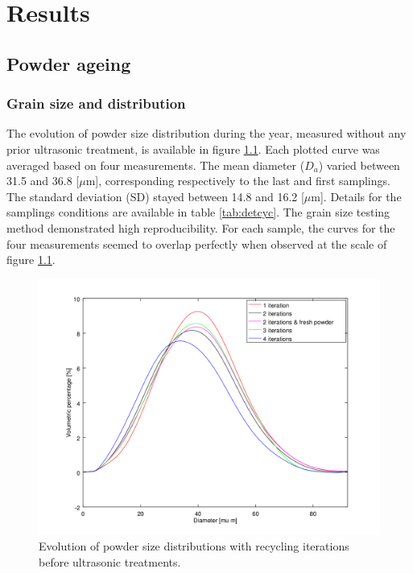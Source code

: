 \chapter{Results}
\label{Chap4}
\section{Powder ageing}

\subsection{Grain size and distribution}
\label{RGSAD}

The evolution of powder size distribution during the year, measured without any prior ultrasonic treatment, is available in figure \ref{fig:granulo}. Each plotted curve was averaged based on four measurements. The mean diameter ($D_a$) varied between 31.5 and 36.8 [$\mu$m], corresponding respectively to the last and first samplings. The standard deviation (SD) stayed between 14.8 and 16.2 [$\mu$m]. Details for the samplings conditions are available  in table \ref{tab:detcyc}. The grain size testing method demonstrated high reproducibility. For each sample, the curves for the four measurements seemed to overlap perfectly when observed at the scale of figure \ref{fig:granulo}.\\%

\begin{figure}[ht]
	\centering
	\includegraphics[scale=0.73]{Images/Granulo}
	\decoRule
	\caption[Evolution of powder size distributions with recycling iterations before ultrasonic treatments.]{Evolution of powder size distributions with recycling iterations before ultrasonic treatments.}
	\label{fig:granulo}
\end{figure}

